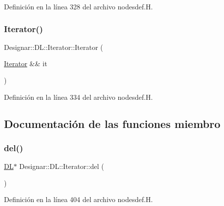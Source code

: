 Definición en la línea 328 del archivo nodesdef.\+H.

\mbox{\label{class_designar_1_1_d_l_1_1_iterator_ae5d00988114ca7cb890fb5e887c5e3ba}} 
\subsubsection{\texorpdfstring{Iterator()}{Iterator()}\hspace{0.1cm}{\footnotesize\ttfamily [5/5]}}
{\footnotesize\ttfamily Designar\+::\+D\+L\+::\+Iterator\+::\+Iterator (\begin{DoxyParamCaption}\item[{\hyperlink{class_designar_1_1_d_l_1_1_iterator}{Iterator} \&\&}]{it }\end{DoxyParamCaption})\hspace{0.3cm}{\ttfamily [inline]}}



Definición en la línea 334 del archivo nodesdef.\+H.



\subsection{Documentación de las funciones miembro}
\mbox{\label{class_designar_1_1_d_l_1_1_iterator_aa21843f313121866b1ad1571c77e65c6}} 
\subsubsection{\texorpdfstring{del()}{del()}}
{\footnotesize\ttfamily \hyperlink{class_designar_1_1_d_l}{DL}$\ast$ Designar\+::\+D\+L\+::\+Iterator\+::del (\begin{DoxyParamCaption}{ }\end{DoxyParamCaption})\hspace{0.3cm}{\ttfamily [inline]}}



Definición en la línea 404 del archivo nodesdef.\+H.


